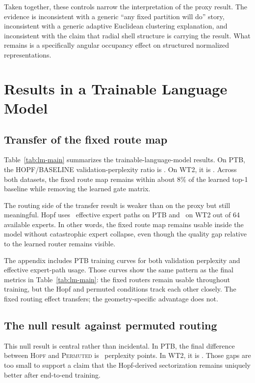 \documentclass[10pt,letterpaper]{article}
\begin{document}
Taken together, these controls narrow the interpretation of the proxy result. The evidence is inconsistent with a generic ``any fixed partition will do'' story, inconsistent with a generic adaptive Euclidean clustering explanation, and inconsistent with the claim that radial shell structure is carrying the result. What remains is a specifically angular occupancy effect on structured normalized representations.

\section{Results in a Trainable Language Model}
\subsection{Transfer of the fixed route map}
Table~\ref{tab:lm-main} summarizes the trainable-language-model results. On PTB, the HOPF/BASELINE validation-perplexity ratio is \PaperPTBHopfBaselineRatio. On WT2, it is \PaperWTTwoHopfBaselineRatio. Across both datasets, the fixed route map remains within about $8\%$ of the learned top-1 baseline while removing the learned gate matrix.

\begin{table}[t]
  \centering
  \caption{Main trainable-model result. Fixed angular routing is usable in a two-layer language model on both PTB and WT2, but the Hopf-derived assignment does not outperform the permuted fixed-routing null.}
  \label{tab:lm-main}
  \small
  
\end{table}

The routing side of the transfer result is weaker than on the proxy but still meaningful. Hopf uses \PaperPTBHopfEff\ effective expert paths on PTB and \PaperWTTwoHopfEff\ on WT2 out of 64 available experts. In other words, the fixed route map remains usable inside the model without catastrophic expert collapse, even though the quality gap relative to the learned router remains visible.

The appendix includes PTB training curves for both validation perplexity and effective expert-path usage. Those curves show the same pattern as the final metrics in Table~\ref{tab:lm-main}: the fixed routers remain usable throughout training, but the Hopf and permuted conditions track each other closely. The fixed routing effect transfers; the geometry-specific advantage does not.

\subsection{The null result against permuted routing}
\label{sec:null}
This null result is central rather than incidental. In PTB, the final difference between \textsc{Hopf} and \textsc{Permuted} is \PaperPTBHopfPermDelta\ perplexity points. In WT2, it is \PaperWTTwoHopfPermDelta. Those gaps are too small to support a claim that the Hopf-derived sectorization remains uniquely better after end-to-end training.
\end{document}
